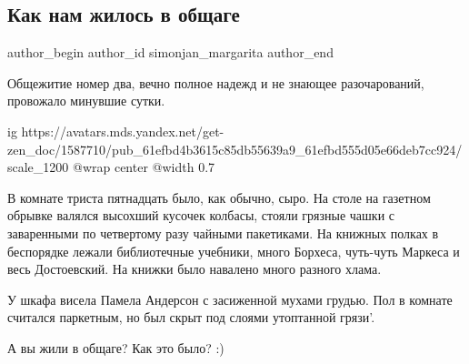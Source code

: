  
 
 
 
 
 
\subsection{Как нам жилось в общаге}
\label{sec:25_01_2022.yz.simonjan_margarita.1.kak_nam_zhilos_v_obschage}
 
\ifcmt
 author_begin
   author_id simonjan_margarita
 author_end
\fi

Общежитие номер два, вечно полное надежд и не знающее разочарований, провожало
минувшие сутки.

\ifcmt
  ig https://avatars.mds.yandex.net/get-zen_doc/1587710/pub_61efbd4b3615c85db55639a9_61efbd555d05e66deb7cc924/scale_1200
	@wrap center
	@width 0.7
\fi

В комнате триста пятнадцать было, как обычно, сыро. На столе на газетном
обрывке валялся высохший кусочек колбасы, стояли грязные чашки с заваренными по
четвертому разу чайными пакетиками. На книжных полках в беспорядке лежали
библиотечные учебники, много Борхеса, чуть-чуть Маркеса и весь Достоевский. На
книжки было навалено много разного хлама.

У шкафа висела Памела Андерсон с засиженной мухами грудью. Пол в комнате
считался паркетным, но был скрыт под слоями утоптанной грязи'.

А вы жили в общаге? Как это было? :)
